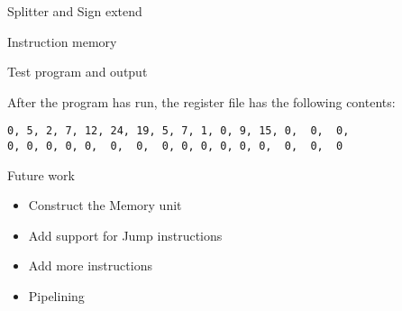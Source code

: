 \documentclass{beamer}
\begin{document}
\begin{frame}{Splitter and Sign extend}
    
    
\end{frame}

\begin{frame}{Instruction memory}
    
\end{frame}

\begin{frame}[fragile]{Test program and output}
    
    After the program has run, the register file has the following contents:
    \begin{lstlisting}[numbers=none]
0, 5, 2, 7, 12, 24, 19, 5, 7, 1, 0, 9, 15, 0,  0,  0,
0, 0, 0, 0, 0,  0,  0,  0, 0, 0, 0, 0, 0,  0,  0,  0
    \end{lstlisting}
\end{frame}

\begin{frame}{Future work}
    \begin{itemize}
        \item Construct the Memory unit
        \item Add support for Jump instructions
        \item Add more instructions
        \item Pipelining
    \end{itemize}
\end{frame}

\AtBeginSection{}
\section*{}

%  
%  
\end{document}
